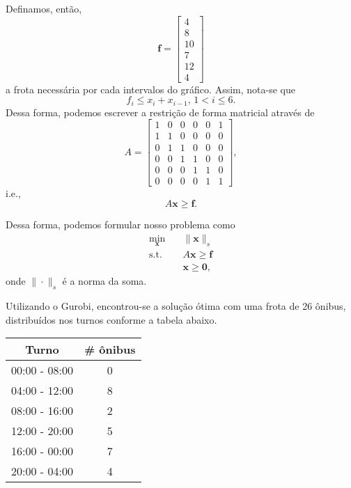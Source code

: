 \documentclass[a4paper]{report}
\begin{document}
Definamos, então, \[
\bm{f} = \begin{bmatrix} 4 \\ 8 \\ 10 \\ 7 \\ 12 \\ 4 \end{bmatrix} 
\] a frota necessária por cada intervalos do gráfico. Assim, nota-se que \[
f_i \le x_i + x_{i-1},\, 1 < i \le 6
.\] Dessa forma, podemos escrever a restrição de forma matricial através de \[
A = \begin{bmatrix}
    1 & 0 & 0 & 0 & 0 & 1 \\
    1 & 1 & 0 & 0 & 0 & 0 \\
    0 & 1 & 1 & 0 & 0 & 0 \\
    0 & 0 & 1 & 1 & 0 & 0 \\
    0 & 0 & 0 & 1 & 1 & 0 \\
    0 & 0 & 0 & 0 & 1 & 1
\end{bmatrix} 
,\] i.e., \[
A \bm{x} \ge \bm{f}
.\] 

Dessa forma, podemos formular nosso problema como
\begin{align*}
    \min_{\bm{x}} \quad & \|\bm{x} \|_{s} \\
    \textrm{s.t.} \quad & A \bm{x} \ge \bm{f} \\
      & \bm{x} \ge \bm{0}
,\end{align*}
onde $\|\cdot \|_s$ é a norma da soma.

Utilizando o Gurobi, encontrou-se a solução ótima com uma frota de 26 ônibus, distribuídos nos turnos conforme a tabela abaixo.

\begin{table}[H]
    \centering
    \begin{tabular}{c | c}
    Turno & \# ônibus \\
    \hline
    00:00 - 08:00 & 0 \\
    04:00 - 12:00 & 8 \\
    08:00 - 16:00 & 2 \\
    12:00 - 20:00 & 5 \\
    16:00 - 00:00 & 7 \\
    20:00 - 04:00 & 4
    \end{tabular}
\end{table}
\end{document}
